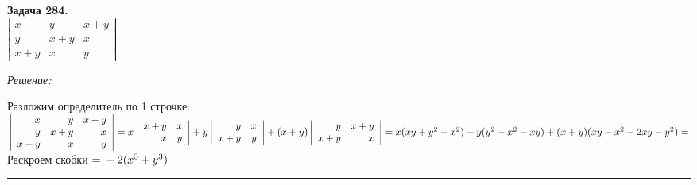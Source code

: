 \documentclass[a4paper, 12pt]{article}
\newenvironment{problem}[2][Задача]
    { \begin{mdframed}[backgroundcolor=gray!10] \textbf{#1 #2.} \\}
    {  \end{mdframed}}
\newenvironment{solution}
    {\textit{Решение: }}
    {\noindent\rule{7in}{1.5pt}}
\begin{document}
\begin{problem}{284}
$\left| \begin{array}{rrr}x & y & x+y \\ y & x+y & x \\ x+y & x & y \end{array} \right|$
\end{problem}
\begin{solution}

Разложим определитель по 1 строчке: \\
$
\left|
\begin{array}{rrr}
x & y & x+y \\
y & x+y & x \\
x+y & x & y
\end{array}
\right|
=
x
\left|
\begin{array}{rrr}
x+y & x \\
x & y
\end{array}
\right|
+
y
\left|
\begin{array}{rrr}
y & x \\
x+y & y
\end{array}
\right|
+
(x + y)
\left|
\begin{array}{rrr}
y & x+y \\
x+y & x
\end{array}
\right|
= \\
\\
x(xy + y^2 -x^2) - y(y^2 - x^2 - xy) + (x + y)(xy - x^2 - 2xy - y^2) =$ Раскроем скобки $= \\
-2(x^3 + y^3)
$

\end{solution} 

\end{document}
